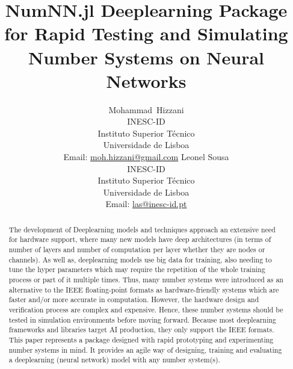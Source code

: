 \documentclass{article}
\title{NumNN.jl Deeplearning Package for Rapid Testing and Simulating Number Systems on Neural Networks}
\author{%
	{Mohammad~Hizzani}\\
	{INESC-ID\\ Instituto Superior Técnico\\ Universidade de Lisboa\\
		Email: \href{mailto:moh.hizzani@gmail.com}{moh.hizzani@gmail.com}}
	\AND
	{Leonel Sousa}\\
	{INESC-ID\\ Instituto Superior Técnico\\ Universidade de Lisboa\\
		Email: \href{mailto:las@inesc-id.pt}{las@inesc-id.pt}}
}
\begin{document}
	\maketitle

	\begin{abstract}
		The development of Deeplearning models and techniques approach an extensive need for hardware support, where many new models have deep architectures (in terms of number of layers and number of computation per layer whether they are nodes or channels). As well as, deeplearning models use big data for training, also needing to tune the hyper parameters which may require the repetition of the whole training process or part of it multiple times. Thus, many number systems were introduced as an alternative to the IEEE floating-point formats as hardware-friendly systems which are faster and/or more accurate in computation. However, the hardware design and verification process are complex and expensive. Hence, these number systems should be tested in simulation environments before moving forward. Because most deeplearning frameworks and libraries target AI production, they only support the IEEE formats. This paper represents a package designed with rapid prototyping and experimenting number systems in mind. It provides an agile way of designing, training and evaluating a deeplearning (neural network) model with any number system(s).
	\end{abstract}

	
	
	
	
	
%	
	
	
	
\end{document}
